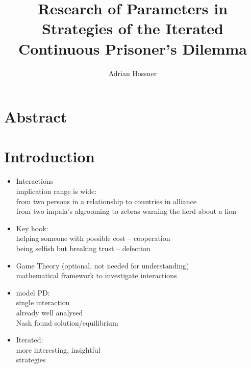 \documentclass{article}
\title{Research of Parameters in Strategies of the Iterated Continuous Prisoner's Dilemma}
\author{Adrian Hossner}
\date{ } %
\begin{document}
\maketitle

\newpage
\tableofcontents
\newpage

\section*{Abstract}

\section{Introduction}

\begin{itemize}


	\item Interactions\\
		implication range is wide:\\
		from two persons in a relationship to countries in alliance\\
		from two impala's algrooming to zebras warning the herd about a lion \\

	\item Key hook:\\
		helping someone with possible cost -- cooperation\\
		being selfish but breaking trust -- defection\\

	\item Game Theory (optional, not needed for understanding)\\
		mathematical framework to investigate interactions\\

	\item model PD:\\
		single interaction\\
		already well analysed\\
		Nash found solution/equilibrium\\

	\item Iterated:\\
		more interesting, insightful\\
		strategies\\


\end{itemize}
\end{document}
